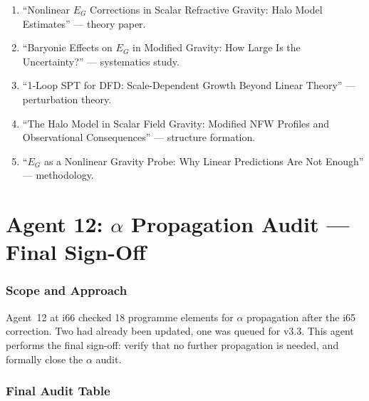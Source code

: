 \documentclass[11pt,a4paper]{article}
\begin{document}
\begin{enumerate}
\item ``Nonlinear $E_G$ Corrections in Scalar Refractive Gravity: Halo Model Estimates'' --- theory paper.
\item ``Baryonic Effects on $E_G$ in Modified Gravity: How Large Is the Uncertainty?'' --- systematics study.
\item ``1-Loop SPT for DFD: Scale-Dependent Growth Beyond Linear Theory'' --- perturbation theory.
\item ``The Halo Model in Scalar Field Gravity: Modified NFW Profiles and Observational Consequences'' --- structure formation.
\item ``$E_G$ as a Nonlinear Gravity Probe: Why Linear Predictions Are Not Enough'' --- methodology.
\end{enumerate}


\part{Agent 12: $\alpha$ Propagation Audit --- Final Sign-Off}
\label{part:alpha-final}

\section{Scope and Approach}

Agent~12 at i66 checked 18 programme elements for $\alpha$ propagation after the i65 correction. Two had already been updated, one was queued for v3.3. This agent performs the final sign-off: verify that no further propagation is needed, and formally close the $\alpha$ audit.

\section{Final Audit Table}
\end{document}
